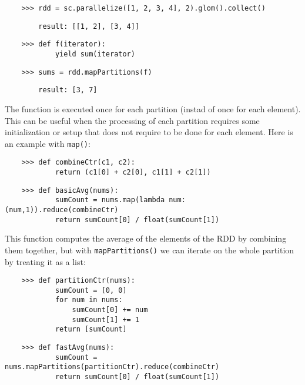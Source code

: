 \begin{lstlisting}
    >>> rdd = sc.parallelize([1, 2, 3, 4], 2).glom().collect()
\end{lstlisting}

\begin{lstlisting}
        result: [[1, 2], [3, 4]]
\end{lstlisting}

\begin{lstlisting}
    >>> def f(iterator):
            yield sum(iterator)
\end{lstlisting}

\begin{lstlisting}
    >>> sums = rdd.mapPartitions(f)
\end{lstlisting}

\begin{lstlisting}
        result: [3, 7]
\end{lstlisting}

The function is executed once for each partition (instad of once for each element). This can be useful when the processing of each partition requires some initialization or setup that does not require to be done for each element. Here is an example with \texttt{map()}:

\begin{lstlisting}
    >>> def combineCtr(c1, c2):
            return (c1[0] + c2[0], c1[1] + c2[1])
\end{lstlisting}

\begin{lstlisting}
    >>> def basicAvg(nums):
            sumCount = nums.map(lambda num: (num,1)).reduce(combineCtr)
            return sumCount[0] / float(sumCount[1])
\end{lstlisting}

This function computes the average of the elements of the RDD by combining them together, but with \texttt{mapPartitions()} we can iterate on the whole partition by treating it as a list:

\begin{lstlisting}
    >>> def partitionCtr(nums):
            sumCount = [0, 0]
            for num in nums:
                sumCount[0] += num
                sumCount[1] += 1
            return [sumCount]
\end{lstlisting}

\begin{lstlisting}
    >>> def fastAvg(nums):
            sumCount = nums.mapPartitions(partitionCtr).reduce(combineCtr)
            return sumCount[0] / float(sumCount[1])
\end{lstlisting}


